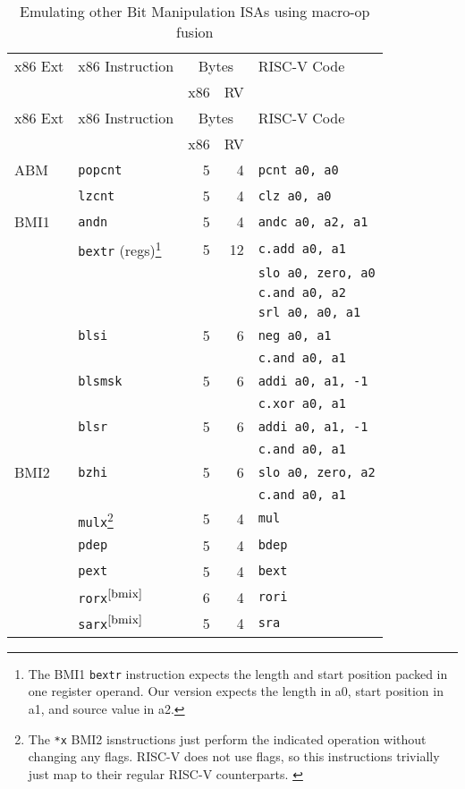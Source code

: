 \begin{longtable}[c]{@{}llrrl@{}}
\caption{Emulating other Bit Manipulation ISAs using macro-op fusion}\tabularnewline
\toprule
x86 Ext & x86 Instruction & \multicolumn{2}{c}{Bytes} & RISC-V Code\tabularnewline
        &                 & x86 & RV            &\tabularnewline
\midrule
\endfirsthead
\toprule
x86 Ext & x86 Instruction & \multicolumn{2}{c}{Bytes} & RISC-V Code\tabularnewline
        &                 & x86 & RV            &\tabularnewline
\midrule
\endhead
ABM  & {\tt popcnt}           & 5 &  4 & {\tt pcnt a0, a0}\tabularnewline
\cline{2-5}
     & {\tt lzcnt}            & 5 &  4 & {\tt clz a0, a0}\tabularnewline
\midrule
BMI1 & {\tt andn}             & 5 &  4 & {\tt andc a0, a2, a1}\tabularnewline
\cline{2-5}
     & {\tt bextr} (regs)\footnote{
         The BMI1 {\tt bextr} instruction expects the length and start position packed in one
	 register operand. Our version expects the length in a0, start position in a1, and source
	 value in a2.
                            } & 5 & 12 & {\tt c.add a0, a1}\tabularnewline
     &                        &   &    & {\tt slo a0, zero, a0}\tabularnewline
     &                        &   &    & {\tt c.and a0, a2}\tabularnewline
     &                        &   &    & {\tt srl a0, a0, a1}\tabularnewline
\cline{2-5}
     & {\tt blsi}             & 5 &  6 & {\tt neg a0, a1}\tabularnewline
     &                        &   &    & {\tt c.and a0, a1}\tabularnewline
\cline{2-5}
     & {\tt blsmsk}           & 5 &  6 & {\tt addi a0, a1, -1}\tabularnewline
     &                        &   &    & {\tt c.xor a0, a1}\tabularnewline
\cline{2-5}
     & {\tt blsr}             & 5 &  6 & {\tt addi a0, a1, -1}\tabularnewline
     &                        &   &    & {\tt c.and a0, a1}\tabularnewline
\midrule
BMI2 & {\tt bzhi}             & 5 &  6 & {\tt slo a0, zero, a2}\tabularnewline
     &                        &   &    & {\tt c.and a0, a1}\tabularnewline
\cline{2-5}
     & {\tt mulx}\footnote{
         The \texttt{*x} BMI2 isnstructions just perform the indicated operation without
	 changing any flags. RISC-V does not use flags, so this instructions trivially
	 just map to their regular RISC-V counterparts.
                \label{bmix}} & 5 &  4 & {\tt mul}\tabularnewline
\cline{2-5}
     & {\tt pdep}             & 5 &  4 & {\tt bdep}\tabularnewline
\cline{2-5}
     & {\tt pext}             & 5 &  4 & {\tt bext}\tabularnewline
\cline{2-5}
     & {\tt rorx}$^{\ref{bmix}}$ & 6 &  4 & {\tt rori}\tabularnewline
\cline{2-5}
     & {\tt sarx}$^{\ref{bmix}}$ & 5 &  4 & {\tt sra}\tabularnewline

\end{longtable}
